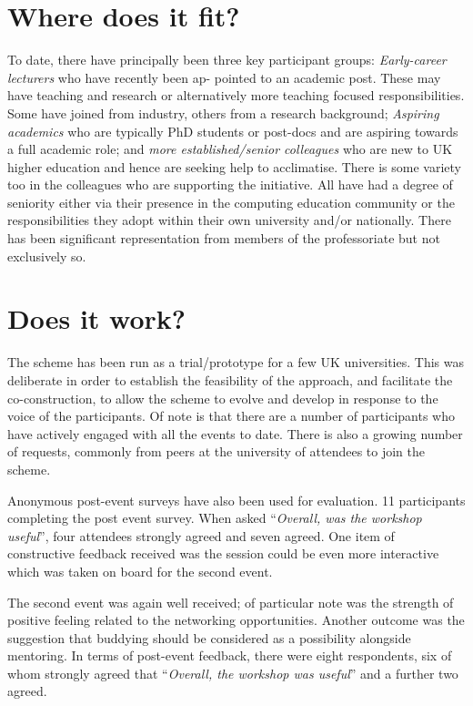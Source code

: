 \documentclass[sigconf]{acmart}
\begin{document}
\section{Where does it fit?}
To date, there have principally been three key participant
groups: {\emph{Early-career lecturers}} who have recently been ap-
pointed to an academic post. These may have teaching and research or
alternatively more teaching focused responsibilities. Some have joined
from industry, others from a research background; {\emph{Aspiring
		academics}} who are typically PhD students or post-docs and are
aspiring towards a full academic role; and {\emph{more
		established/senior colleagues}} who are new to UK higher education
and hence are seeking help to acclimatise. There is some
variety too in the colleagues who are supporting the initiative. All
have had a degree of seniority either via their presence in the
computing education community or the responsibilities they adopt
within their own university and/or nationally. There has been
significant representation from members of the professoriate but not
exclusively so.
\section{Does it work?}	
\label{Sec:DoesItWork}
The scheme has been run as a trial/prototype for a few UK
universities. This was deliberate in order to establish the
feasibility of the approach, and facilitate the co-construction, to
allow the scheme to evolve and develop in response to the voice of the
participants. Of note is that there are a number of participants who
have actively engaged with all the events to date. There is also a
growing number of requests, commonly from peers at the university of
attendees to join the scheme.

Anonymous post-event surveys have also been used for evaluation. 11 participants completing the post
event survey. When asked ``{\emph{Overall, was the workshop
		useful}}'', four attendees strongly agreed and seven agreed. One item
of constructive feedback received was the session could be even more
interactive which was taken on board for the second event.

The second event was again well received; of particular note was the
strength of positive feeling related to the networking
opportunities. Another outcome was the suggestion that buddying
should be considered as a possibility alongside mentoring. In terms of
post-event feedback, there were eight respondents, six of whom
strongly agreed that ``{\emph{Overall, the workshop was useful}}'' and
a further two agreed.
\end{document}
